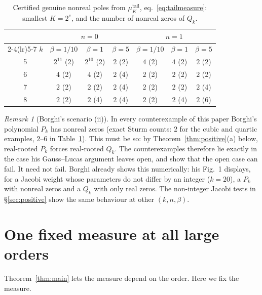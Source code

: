 \documentclass[11pt,a4paper]{article}
\theoremstyle{definition}
\theoremstyle{remark}
\newtheorem{remark}[theorem]{Remark}
\begin{document}
\begin{table}[htbp]
\centering
\caption{Certified genuine nonreal poles from $\mu^{\mathrm{tail}}_K$,
eq.~\eqref{eq:tailmeasure}: smallest $K=2^e$, and the number of nonreal
zeros of $Q_k$.}
\label{tab:tail}
\small
\begin{tabular}{@{}ccccccc@{}}
\toprule
& \multicolumn{3}{c}{$n=0$} & \multicolumn{3}{c}{$n=1$}\\
\cmidrule(lr){2-4}\cmidrule(lr){5-7}
$k$ & $\beta=1/10$ & $\beta=1$ & $\beta=5$ & $\beta=1/10$ & $\beta=1$ & $\beta=5$\\
\midrule
5 & $2^{11}$ (2) & $2^{10}$ (2) & $2$ (2) & $4$ (2) & $4$ (2) & $2$ (2)\\
6 & $4$ (2) & $4$ (2) & $2$ (4) & $2$ (2) & $2$ (2) & $2$ (2)\\
7 & $2$ (2) & $2$ (2) & $2$ (4) & $2$ (2) & $2$ (2) & $2$ (4)\\
8 & $2$ (2) & $2$ (4) & $2$ (4) & $2$ (2) & $2$ (4) & $2$ (6)\\
\bottomrule
\end{tabular}
\end{table}

\begin{remark}[Borghi's scenario (ii)]\label{rem:scenario}
In every counterexample of this paper Borghi's polynomial $P_k$ has
nonreal zeros (exact Sturm counts: $2$ for the cubic and quartic examples,
$2$--$6$ in Table~\ref{tab:tail}). This must be so: by
Theorem~\ref{thm:positive}(a) below, real-rooted $P_k$ forces real-rooted
$Q_k$. The counterexamples therefore lie exactly in the case his
Gauss--Lucas argument leaves open, and show that the open case can fail.
It need not fail. Borghi already shows this numerically: his Fig.~1
\cite[\S4.6]{Borghi2026} displays, for a Jacobi weight whose parameters do
not differ by an integer ($k=20$), a $P_k$ with nonreal zeros and a $Q_k$
with only real zeros. The non-integer Jacobi tests in \S\ref{sec:positive}
show the same behaviour at other $(k,n,\beta)$.
\end{remark}

\section{One fixed measure at all large orders}\label{sec:persistence}

Theorem~\ref{thm:main} lets the measure depend on the order. Here we fix
the measure.
\end{document}
